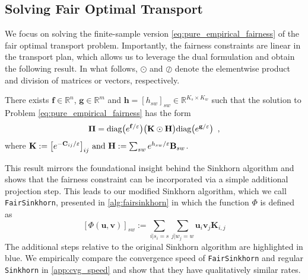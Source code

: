 \documentclass{article}
\theoremstyle{definition}
\begin{document}
\subsection{Solving Fair Optimal Transport}
We focus on solving the finite-sample version \eqref{eq:pure_empirical_fairness} of the fair optimal transport problem. Importantly, the fairness constraints are linear in the transport plan, which allows us to leverage the dual formulation and obtain the following result. In what follows, $\odot$ and $\oslash$ denote the elementwise product and division of matrices or vectors, respectively.
\begin{boxprop}
\label{lem:form_fair_discrete_ot}
    There exists $\mathbf{f} \in \mathbb{R}^{n}$, $\mathbf{g} \in \mathbb{R}^{m}$ and $\mathbf{h} = [h_{sw}]_{sw} \in \mathbb{R}^{K_s \times K_w}$ such that the solution to Problem \eqref{eq:pure_empirical_fairness} has the form \begin{align*}
            \mathbf{\Pi} = \textnormal{diag}\big(e^{\mathbf{f}/\varepsilon}\big) \big(\mathbf{K} \odot \mathbf{H}\big)\textnormal{diag}\big(e^{\mathbf{g}/\varepsilon}\big)\enspace,
        \end{align*}
        where 
            $\mathbf{K} := \big[e^{-\mathbf{C}_{ij}/\varepsilon}\big]_{ij} \textnormal{ and } \mathbf{H} := \textstyle\sum_{sw}e^{h_{sw}/\varepsilon}\mathbf{B}_{sw}$.
\end{boxprop}
This result mirrors the foundational insight behind the Sinkhorn algorithm and shows that the fairness constraint can be incorporated via a simple additional projection step. This leads to our modified Sinkhorn algorithm, which we call \texttt{FairSinkhorn}, presented in \cref{alg:fairsinkhorn} in which the function $\Phi$ is defined as
$$
    [\Phi(\mathbf{u},\mathbf{v})]_{sw} := \sum_{i\lvert s_i=s}\sum_{j \lvert w_j = w} \mathbf{u}_i\mathbf{v}_j\mathbf{K}_{i,j} 
$$
The additional steps relative to the original Sinkhorn algorithm are highlighted in blue. We empirically compare the convergence speed of \texttt{FairSinkhorn} and regular \texttt{Sinkhorn} in  \cref{app:cvg_speed} and show that they have qualitatively similar rates.
\end{document}
